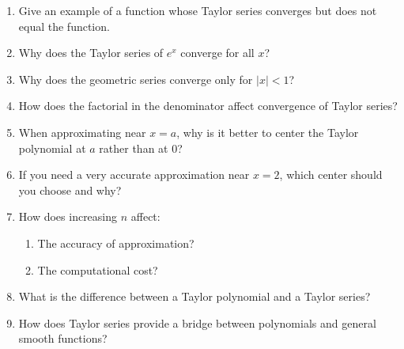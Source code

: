 \begin{enumerate}
\item Give an example of a function whose Taylor series converges but does not equal the function.

\item Why does the Taylor series of $e^x$ converge for all $x$?

\item Why does the geometric series converge only for $|x|<1$?

\item How does the factorial in the denominator affect convergence of Taylor series?

\item When approximating near $x=a$, why is it better to center the Taylor polynomial at $a$ rather than at $0$?

\item If you need a very accurate approximation near $x=2$, which center should you choose and why?

\item How does increasing $n$ affect:
  \begin{enumerate}
    \item The accuracy of approximation?
    \item The computational cost?
  \end{enumerate}

\item What is the difference between a Taylor polynomial and a Taylor series?

\item How does Taylor series provide a bridge between polynomials and general smooth functions?

\end{enumerate}
